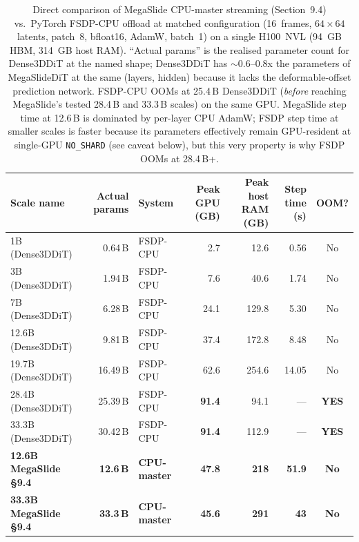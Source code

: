 \documentclass[11pt, letterpaper]{article}
\begin{document}
\begin{table}[h]
\centering
\small
\begin{tabular}{lrlrrrc}
\toprule
\textbf{Scale name} & \textbf{Actual params} & \textbf{System} & \textbf{Peak GPU (GB)} & \textbf{Peak host RAM (GB)} & \textbf{Step time (s)} & \textbf{OOM?} \\
\midrule
1B (Dense3DDiT)    & 0.64\,B   & FSDP-CPU      & 2.7   & 12.6  & 0.56  & No \\
3B (Dense3DDiT)    & 1.94\,B   & FSDP-CPU      & 7.6   & 40.6  & 1.74  & No \\
7B (Dense3DDiT)    & 6.28\,B   & FSDP-CPU      & 24.1  & 129.8 & 5.30  & No \\
12.6B (Dense3DDiT) & 9.81\,B   & FSDP-CPU      & 37.4  & 172.8 & 8.48  & No \\
19.7B (Dense3DDiT) & 16.49\,B  & FSDP-CPU      & 62.6  & 254.6 & 14.05 & No \\
28.4B (Dense3DDiT) & 25.39\,B  & FSDP-CPU      & \textbf{91.4} & 94.1 & ---   & \textbf{YES} \\
33.3B (Dense3DDiT) & 30.42\,B  & FSDP-CPU      & \textbf{91.4} & 112.9 & ---  & \textbf{YES} \\
\textbf{12.6B MegaSlide \S9.4} & \textbf{12.6\,B} & \textbf{CPU-master} & \textbf{47.8} & \textbf{218} & \textbf{51.9} & \textbf{No} \\
\textbf{33.3B MegaSlide \S9.4} & \textbf{33.3\,B} & \textbf{CPU-master} & \textbf{45.6} & \textbf{291} & \textbf{43}   & \textbf{No} \\
\bottomrule
\end{tabular}
\caption{Direct comparison of MegaSlide CPU-master streaming (Section~9.4) vs.\ PyTorch FSDP-CPU offload at matched configuration (16~frames, $64\times64$ latents, patch~8, bfloat16, AdamW, batch~1) on a single H100~NVL (94~GB HBM, 314~GB host RAM). ``Actual params'' is the realised parameter count for Dense3DDiT at the named shape; Dense3DDiT has $\sim$0.6--0.8x the parameters of MegaSlideDiT at the same (layers, hidden) because it lacks the deformable-offset prediction network. FSDP-CPU OOMs at 25.4\,B Dense3DDiT (\emph{before} reaching MegaSlide's tested 28.4\,B and 33.3\,B scales) on the same GPU. MegaSlide step time at 12.6\,B is dominated by per-layer CPU AdamW; FSDP step time at smaller scales is faster because its parameters effectively remain GPU-resident at single-GPU \texttt{NO\_SHARD} (see caveat below), but this very property is why FSDP OOMs at 28.4\,B+.}
\label{tab:fsdp_compare}
\end{table}
\end{document}
